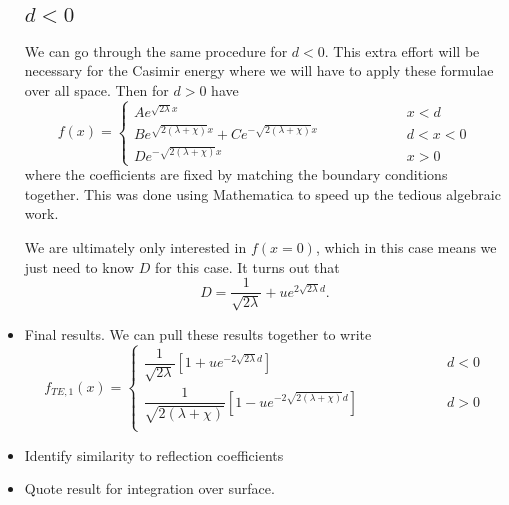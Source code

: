\begin{itemize}
    \subsection{$d<0$}
    We can go through the same procedure for $d<0$.
    This extra effort will be necessary for the Casimir energy where we will have to apply these formulae over all space.    
    Then for $d>0$ have 
    \begin{equation}
      f(x) =\left\{ 
        \begin{array}{lcr}  A e^{\sqrt{2\lambda} x} & \hspace{2cm} & x<d\\
          B e^{\sqrt{2(\lambda+\chi)}x} + Ce^{-\sqrt{2(\lambda+\chi)}x} & \hspace{2cm} & d<x<0\\
          D e^{-\sqrt{2(\lambda+\chi)}x} & \hspace{2cm} & x>0
        \end{array}
      \right.
    \end{equation}
    where the coefficients are fixed by matching the boundary conditions together.
    This was done using Mathematica to speed up the tedious algebraic work.  

    We are ultimately only interested in $f(x=0)$, which in this case means we just need to know $D$ for this case.
    It turns out that 
    \begin{equation}
      D = \frac{1}{\sqrt{2\lambda}} + u e^{2\sqrt{2\lambda}d}.
    \end{equation}
    \item Final results.
    We can pull these results together to write
    \begin{equation}
      f_{TE,1}(x) = \left\{\begin{array}{lcr} 
          \dfrac{1}{\sqrt{2\lambda}}\left[1+ u e^{-2\sqrt{2\lambda}d}\right]  & \hspace{2cm} & d<0\\
          \dfrac{1}{\sqrt{2(\lambda+\chi)}}\left[1 - u e^{-2\sqrt{2(\lambda+\chi)}d}\right] & \hspace{2cm} & d>0\\
        \end{array} \right. 
    \end{equation}

  \item Identify similarity to reflection coefficients
  \item {Quote result for integration over surface.}


\end{itemize}
